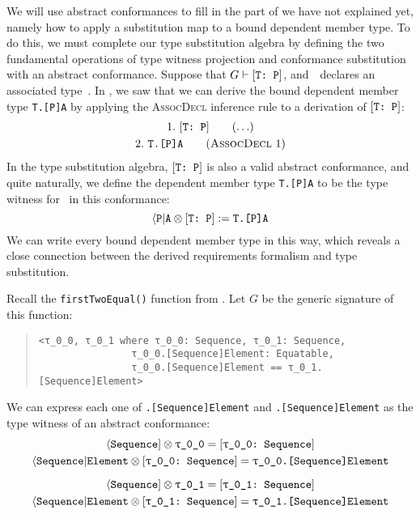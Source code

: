 \documentclass[../generics]{subfiles}
\begin{document}
We will use abstract conformances to fill in the part of  we have not explained yet, namely how to apply a substitution map to a bound dependent member type. To do this, we must complete our type substitution algebra by defining the two fundamental operations of type witness projection and conformance substitution with an abstract conformance. Suppose that $G\vdash[\texttt{T:~P}]$, and~\tP\ declares an associated type~\nA. In , we saw that we can derive the bound dependent member type \texttt{T.[P]A} by applying the \textsc{AssocDecl} inference rule to a derivation of $[\texttt{T:~P}]$:
\begin{gather*}
\AnyStep{\TP}{1}\\
\AssocDeclStep{1}{T.[P]A}{2}
\end{gather*}
In the type substitution algebra, $[\texttt{T:~P}]$ is also a valid abstract conformance, and quite naturally, we define the dependent member type \texttt{T.[P]A} to be the type witness for \nA\ in this conformance:
\[\langle\texttt{P}|\texttt{A} \otimes [\texttt{T:~P}] := \texttt{T.[P]A}\]
We can write every bound dependent member type in this way, which reveals a close connection between the derived requirements formalism and type substitution.
\begin{example}\label{abstract conformance example}
Recall the \texttt{firstTwoEqual()} function from . Let $G$ be the generic signature of this function:
\begin{quote}
\begin{verbatim}
<τ_0_0, τ_0_1 where τ_0_0: Sequence, τ_0_1: Sequence,
                τ_0_0.[Sequence]Element: Equatable,
                τ_0_0.[Sequence]Element == τ_0_1.[Sequence]Element>
\end{verbatim}
\end{quote}
We can express each one of \texttt{\rT.[Sequence]Element} and \texttt{\rU.[Sequence]Element} as the type witness of an abstract conformance:
\begin{gather*}
\PSequence \otimes \texttt{\rT} = \ConfReq{\rT}{Sequence}\\
\AElement \otimes \ConfReq{\rT}{Sequence} = \texttt{\rT.[Sequence]Element}\\[\medskipamount]
\PSequence \otimes \texttt{\rU} = \ConfReq{\rU}{Sequence}\\
\AElement \otimes \ConfReq{\rU}{Sequence} = \texttt{\rU.[Sequence]Element}
\end{gather*}
\end{example}
\end{document}
